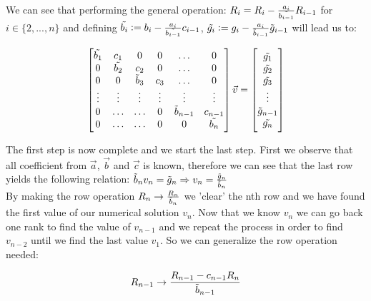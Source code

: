\documentclass[a4paper,10pt,english]{article}
\begin{document}
We can see that performing the general operation:
$R_i = R_i - \frac{a_i}{\Tilde{b_{i-1}}}R_{i-1}$ for $i \in \{2, ..., n\}$ and
defining $\Tilde{b_i} := b_i -\frac{a_i}{\Tilde{b_{i-1}}}c_{i-1}$,
$\Tilde{g_i} := g_i - \frac{a_i}{\Tilde{b}_{i-1}}\Tilde{g}_{i-1}$ will lead us
to:

\[
                 \begin{bmatrix}
                 \Tilde{b_1} & c_1 & 0 & 0 & \dots & 0 \\
                  0 & \Tilde{b_2} & c_2 & 0 & \dots & 0\\
                 0 & 0 & \Tilde{b}_3 & c_3 & \dots & 0\\
                 \vdots & \vdots &  \vdots & \vdots & \vdots & \vdots \\
                 0 & \dots &  \dots & 0 & \Tilde{b}_{n-1} & c_{n-1} \\
                 0 & \dots &  \dots & 0 & 0 & \Tilde{b_{n}}
                 \end{bmatrix}
                \vec{v}
                =
                \begin{bmatrix}
                    \Tilde{g_1} \\
                    \Tilde{g_2} \\
                    \Tilde{g_3} \\
                    \vdots \\
                    \Tilde{g}_{n-1} \\
                    \Tilde{g_n} \\
                \end{bmatrix}
\]

The first step is now complete and we start the last step. First we observe that
all coefficient from $\vec{a}$, $\vec{b}$ and $\vec{c}$ is known, therefore we
can see that the last row yields the following relation:
$\Tilde{b}_n v_n = \Tilde{g}_n \Rightarrow v_n = \frac{\Tilde{g}_n}{\Tilde{b}_n}$
\\

By making the row operation $R_n \rightarrow \frac{R_n}{\Tilde{b}_n}$ we 'clear'
the nth row and we have found the first value of our numerical solution $v_n$.
Now that we know $v_n$ we can go back one rank to find the value of $v_{n-1}$
and we repeat the process in order to find $v_{n-2}$ until we find the last
value $v_1$. So we can generalize the row operation needed:

\begin{equation*}
    R_{n-1} \rightarrow \frac{R_{n-1} - c_{n-1}R_n}{\Tilde{b}_{n-1}}
\end{equation*}
\end{document}
